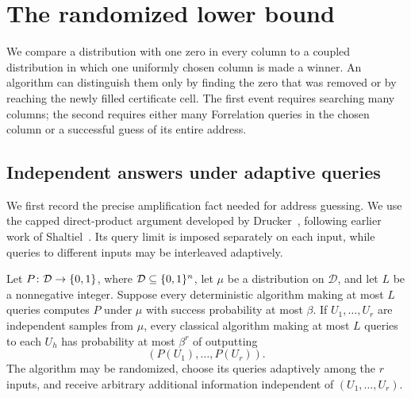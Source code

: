 \section{The randomized lower bound}
\label{sec:classical}

We compare a distribution with one zero in every column to a coupled
distribution in which one uniformly chosen column is made a winner.
An algorithm can distinguish them only by finding the zero that was
removed or by reaching the newly filled certificate cell.  The first
event requires searching many columns; the second requires either many
Forrelation queries in the chosen column or a successful guess of its
entire address.

\subsection{Independent answers under adaptive queries}

We first record the precise amplification fact needed for address
guessing.  We use the capped direct-product argument developed by
Drucker~\cite[Section~1.3 and Lemmas~3.1--3.2]{Drucker12}, following
earlier work of Shaltiel~\cite{Shaltiel03}.  Its query limit is imposed
separately on each input, while queries to different inputs may be
interleaved adaptively.

\begin{lemma}\label{lem:adaptive-product}
Let $P\colon\mathcal D\to\{0,1\}$, where $\mathcal D\subseteq\{0,1\}^n$, let
$\mu$ be a distribution on $\mathcal D$, and let $L$ be a nonnegative
integer.  Suppose every deterministic algorithm making at most $L$
queries computes $P$ under $\mu$ with success probability at most $\beta$.
If $U_1,\ldots,U_r$ are independent samples from $\mu$, every classical
algorithm making at most $L$ queries to each $U_h$ has probability at most
$\beta^r$ of outputting
\[
 (P(U_1),\ldots,P(U_r)).
\]
The algorithm may be randomized, choose its queries adaptively among the
$r$ inputs, and receive arbitrary additional information independent of
$(U_1,\ldots,U_r)$.
\end{lemma}

